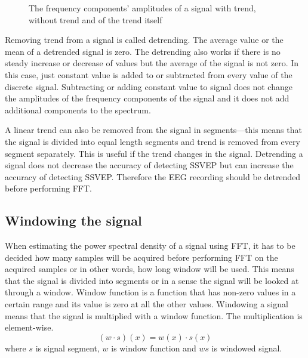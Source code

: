 \begin{figure}[h!]
	
	\caption{The frequency components' amplitudes of a signal with trend, without trend and of the trend itself}
	\label{fig:detrend}
\end{figure}

Removing trend from a signal is called detrending. The average value or the mean of a detrended signal is zero. The detrending also works if there is no steady increase or decrease of values but the average of the signal is not zero. In this case, just constant value is added to or subtracted from every value of the discrete signal. Subtracting or adding constant value to signal does not change the amplitudes of the \glspl{frequency component} of the signal and it does not add additional components to the spectrum.

A linear trend can also be removed from the signal in segments---this means that the signal is divided into equal length segments and trend is removed from every segment separately. This is useful if the trend changes in the signal. Detrending a signal does not decrease the accuracy of detecting \gls{SSVEP} but can increase the accuracy of detecting \gls{SSVEP}. Therefore the \gls{EEG} recording should be detrended before performing \gls{FFT}.

\subsection{Windowing the signal}

When estimating the \gls{power spectral density} of a signal using \gls{FFT}, it has to be decided how many samples will be acquired before performing \gls{FFT} on the acquired samples or in other words, how long window will be used. This means that the signal is divided into segments or in a sense the signal will be looked at through a window. Window function is a function that has non-zero values in a certain range and its value is zero at all the other values. Windowing a signal means that the signal is multiplied with a window function. The multiplication is element-wise.
\begin{equation}
	(w\cdot s)(x)=w(x)\cdot s(x)
\end{equation}
where $s$ is signal segment, $w$ is window function and $ws$ is windowed signal.

